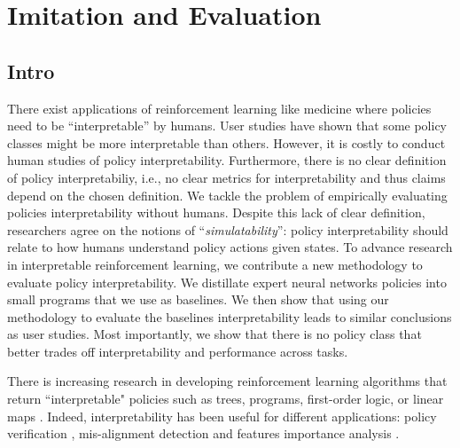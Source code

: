\chapter{Imitation and Evaluation}
\section{Intro}
There exist applications of reinforcement learning like medicine where policies need to be ``interpretable'' by humans. User studies have shown that some policy classes might be more interpretable than others. However, it is costly to conduct human studies of policy interpretability. Furthermore, there is no clear definition of policy interpretabiliy, i.e., no clear metrics for interpretability and thus claims depend on the chosen definition. We tackle the problem of empirically evaluating policies interpretability without humans. Despite this lack of clear definition, researchers agree on the notions of ``\textit{simulatability}'': policy interpretability should relate to how humans understand policy actions given states. To advance research in interpretable reinforcement learning, we contribute a new methodology to evaluate policy interpretability. We distillate expert neural networks policies into small programs that we use as baselines. We then show that using our methodology to evaluate the baselines interpretability leads to similar conclusions as user studies. Most importantly, we show that there is no policy class that better trades off interpretability and performance across tasks. 

There is increasing research in developing reinforcement learning algorithms that return ``interpretable" policies such as trees, programs, first-order logic, or linear maps \cite{viper,PIRL,empirical-evidence,nudge,milani-survey,glanois-survey,kohler2024interpretableeditableprogrammatictree}. Indeed, interpretability has been useful for different applications: policy verification \cite{viper}, mis-alignment detection \cite{scobots,sympol} and features importance analysis \cite{fi-rl,fi-rl2,fi-rl3}.

